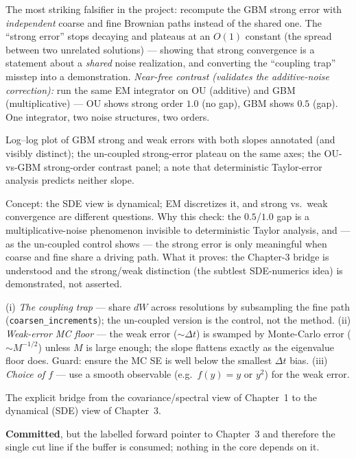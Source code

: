 \documentclass[11pt]{article}
\newenvironment{unitmeta}{%
  \begin{description}[style=sameline,leftmargin=1.4cm,font=\bfseries\color{hubblue}]
}{%
  \end{description}
}
\begin{document}
\begin{unitmeta}
\item[Negative control] The most striking falsifier in the project: recompute the GBM strong error with \emph{independent} coarse and fine Brownian paths instead of the shared one. The ``strong error'' stops decaying and plateaus at an $O(1)$ constant (the spread between two unrelated solutions) --- showing that strong convergence is a statement about a \emph{shared} noise realization, and converting the ``coupling trap'' misstep into a demonstration. \emph{Near-free contrast (validates the additive-noise correction):} run the same EM integrator on OU (additive) and GBM (multiplicative) --- OU shows strong order $1.0$ (no gap), GBM shows $0.5$ (gap). One integrator, two noise structures, two orders.
\item[Artifact] Log--log plot of GBM strong and weak errors with both slopes annotated (and visibly distinct); the un-coupled strong-error plateau on the same axes; the OU-vs-GBM strong-order contrast panel; a note that deterministic Taylor-error analysis predicts neither slope.
\item[README] Concept: the SDE view is dynamical; EM discretizes it, and strong vs.\ weak convergence are different questions. Why this check: the $0.5$/$1.0$ gap is a multiplicative-noise phenomenon invisible to deterministic Taylor analysis, and --- as the un-coupled control shows --- the strong error is only meaningful when coarse and fine share a driving path. What it proves: the Chapter-3 bridge is understood and the strong/weak distinction (the subtlest SDE-numerics idea) is demonstrated, not asserted.
\item[Missteps] (i) \emph{The coupling trap} --- share $dW$ across resolutions by subsampling the fine path (\texttt{coarsen\_increments}); the un-coupled version is the control, not the method. (ii) \emph{Weak-error MC floor} --- the weak error ($\sim\Delta t$) is swamped by Monte-Carlo error ($\sim M^{-1/2}$) unless $M$ is large enough; the slope flattens exactly as the eigenvalue floor does. Guard: ensure the MC SE is well below the smallest $\Delta t$ bias. (iii) \emph{Choice of $f$} --- use a smooth observable (e.g.\ $f(y)=y$ or $y^2$) for the weak error.
\item[Purpose] The explicit bridge from the covariance/spectral view of Chapter~1 to the dynamical (SDE) view of Chapter~3.
\item[Status] \textbf{Committed}, but the labelled forward pointer to Chapter~3 and therefore the single cut line if the buffer is consumed; nothing in the core depends on it.

\end{unitmeta}
\end{document}

